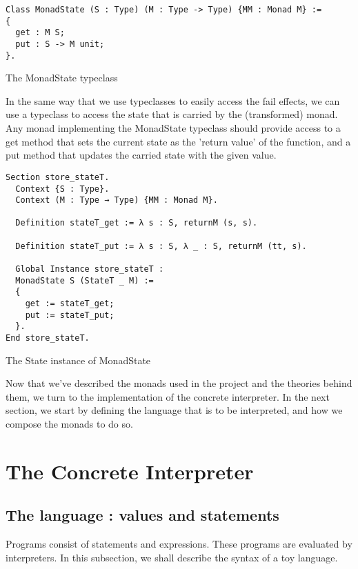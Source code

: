 \begin{listing}
\begin{verbatim}
Class MonadState (S : Type) (M : Type -> Type) {MM : Monad M} :=
{
  get : M S;
  put : S -> M unit;
}.
\end{verbatim}
\caption{The MonadState typeclass}
\label{lst:monadstate}
\end{listing}

In the same way that we use typeclasses to easily access the fail effects, we 
can use a typeclass to access the state that is carried by the (transformed)
monad. Any monad implementing the MonadState typeclass should provide access to
a get method that sets the current state as the 'return value' of the function,
and a put method that updates the carried state with the given value.

\begin{listing}
\begin{verbatim}
Section store_stateT.
  Context {S : Type}.
  Context (M : Type → Type) {MM : Monad M}.

  Definition stateT_get := λ s : S, returnM (s, s).

  Definition stateT_put := λ s : S, λ _ : S, returnM (tt, s).

  Global Instance store_stateT : 
  MonadState S (StateT _ M) :=
  {
    get := stateT_get;
    put := stateT_put;
  }.
End store_stateT.
\end{verbatim}
\caption{The State instance of MonadState}
\label{lst:monadstate_state}
\end{listing}

Now that we've described the monads used in the project and the 
theories behind them, we turn to the implementation of the concrete
interpreter. In the next section, we start by defining the language that is to
be interpreted, and how we compose the monads to do so.

\section{The Concrete Interpreter}\label{sec:concrete}

\subsection{The language : values and statements}
\label{sec:lang}
Programs consist of statements and expressions. These programs are evaluated by
interpreters. In this subsection, we shall describe the syntax of a toy
language.


